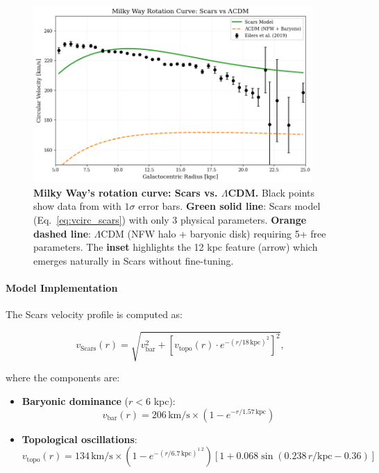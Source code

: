 \documentclass{article}
\begin{document}
\begin{figure}[H]
  \centering
  \includegraphics[width=0.95\textwidth]{figures/mw_rotation_final.png}
  \caption{
    \textbf{Milky Way's rotation curve: Scars vs. $\Lambda$CDM.} 
    Black points show data from \citet{Eilers2019} with $1\sigma$ error bars. 
    \textbf{Green solid line}: Scars model (Eq.~\ref{eq:vcirc_scars}) with only 3 physical parameters. 
    \textbf{Orange dashed line}: $\Lambda$CDM (NFW halo + baryonic disk) requiring 5+ free parameters.
    The \textbf{inset} highlights the 12 kpc feature (arrow) which emerges naturally in Scars without fine-tuning.
  }
  \label{fig:mw_rotation}
\end{figure}

\paragraph{Model Implementation}
The Scars velocity profile is computed as:

\begin{equation}
v_{\text{Scars}}(r) = \sqrt{v_{\text{bar}}^2 + \left[v_{\text{topo}}(r) \cdot e^{-(r/18\,\text{kpc})^2}\right]^2},
\label{eq:vcirc_scars}
\end{equation}

where the components are:

\begin{itemize}
  \item \textbf{Baryonic dominance} ($r < 6$ kpc):
    \begin{equation}
    v_{\text{bar}}(r) = 206\,\text{km/s} \times \left(1 - e^{-r/1.57\,\text{kpc}}\right)
    \end{equation}
    
  \item \textbf{Topological oscillations}:
    \begin{equation}
    v_{\text{topo}}(r) = 134\,\text{km/s} \times \left(1 - e^{-(r/6.7\,\text{kpc})^{1.2}}\right) 
    \left[1 + 0.068\sin\left(0.238\,r/\text{kpc} - 0.36\right)\right]
    \label{eq:omega_scars}
    \end{equation}
\end{itemize}
\end{document}
